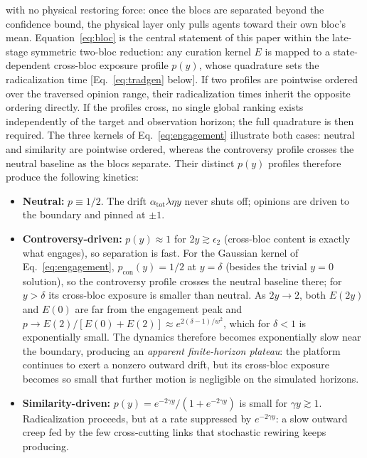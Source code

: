 \documentclass[5p,times,twocolumn]{elsarticle}
\begin{document}
with no physical restoring force: once the blocs are separated beyond the
confidence bound, the physical layer only pulls agents toward their own
bloc's mean. Equation~\eqref{eq:bloc} is the central statement of this
paper within the late-stage symmetric two-bloc reduction: any curation
kernel $E$ is mapped to a state-dependent cross-bloc exposure profile
$p(y)$, whose quadrature sets the radicalization time
[Eq.~\eqref{eq:tradgen} below]. If two profiles are pointwise ordered over
the traversed opinion range, their radicalization times inherit the
opposite ordering directly. If the profiles cross, no single global
ranking exists independently of the target and observation horizon; the
full quadrature is then required. The three kernels of
Eq.~\eqref{eq:engagement} illustrate both cases: neutral and similarity
are pointwise ordered, whereas the controversy profile crosses the
neutral baseline as the blocs separate. Their distinct $p(y)$ profiles
therefore produce the following kinetics:

\begin{itemize}
  \item \textbf{Neutral:} $p \equiv 1/2$. The drift
  $\alpha_{\mathrm{tot}}\lambda \eta y$ never
  shuts off; opinions are driven to the boundary and pinned at $\pm 1$.
  \item \textbf{Controversy-driven:} $p(y) \approx 1$ for
  $2y \gtrsim \epsilon_2$ (cross-bloc content is exactly what engages), so
  separation is fast. For the Gaussian kernel of Eq.~\eqref{eq:engagement},
  $p_{\mathrm{con}}(y)=1/2$ at $y=\delta$ (besides the trivial $y=0$
  solution), so the controversy profile crosses the neutral baseline there;
  for $y>\delta$ its cross-bloc exposure is smaller than neutral. As
  $2y \to 2$, both $E(2y)$ and $E(0)$ are far from the engagement peak and
  $p \to E(2)/[E(0)+E(2)] \approx e^{2(\delta-1)/w^2}$, which for
  $\delta<1$ is exponentially small. The dynamics therefore becomes
  exponentially slow near the boundary, producing an
  \emph{apparent finite-horizon plateau}: the platform continues to exert a
  nonzero outward drift, but its cross-bloc exposure becomes so small that
  further motion is negligible on the simulated horizons.
  \item \textbf{Similarity-driven:} $p(y) = e^{-2\gamma y}/(1 +
  e^{-2\gamma y})$ is small for $\gamma y \gtrsim 1$. Radicalization
  proceeds, but at a rate suppressed by $e^{-2\gamma y}$: a slow outward
  creep fed by the few cross-cutting links that stochastic rewiring keeps
  producing.
\end{itemize}
\end{document}
